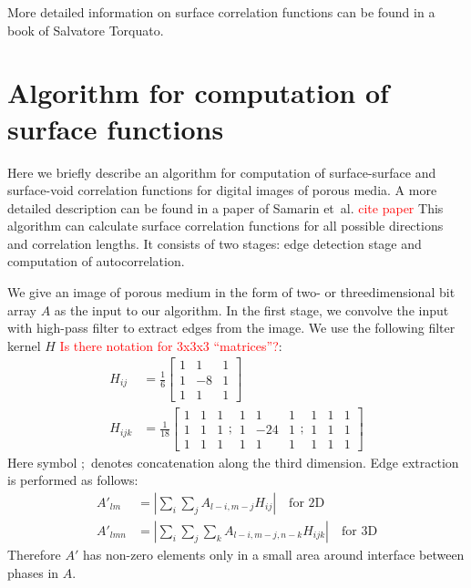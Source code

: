 \documentclass[reprint,amsmath,amssymb,aps,pre,showkeys,showpacs]{revtex4-1}
\begin{document}
More detailed information on surface correlation functions can be found in a
book of Salvatore Torquato\cite{Torquato_book}.

\section{Algorithm for computation of surface functions}
\label{sec:algo}
Here we briefly describe an algorithm for computation of surface-surface and
surface-void correlation functions for digital images of porous media. A more
detailed description can be found in a paper of Samarin
et~al. \textcolor{red}{cite paper} This algorithm can calculate surface
correlation functions for all possible directions and correlation lengths. It
consists of two stages: edge detection stage and computation of
autocorrelation.

We give an image of porous medium in the form of two- or threedimensional bit
array $A$ as the input to our algorithm. In the first stage, we convolve the
input with high-pass filter to extract edges from the image. We use the
following filter kernel $H$ \textcolor{red}{Is there notation for 3x3x3
  ``matrices''?}:
\begin{align}
  H_{ij} &= \frac{1}{6} \left[
    \begin{array}{ccc}
      1 & 1 & 1 \\
      1 & -8 & 1 \\
      1 & 1 & 1
    \end{array}
    \right] \label{eq:filter-3x3-2d} \\
  H_{ijk} &= \frac{1}{18} \left[
    \begin{array}{ccc}
      1 & 1 & 1 \\
      1 & 1 & 1 \\
      1 & 1 & 1
    \end{array} ;
    \begin{array}{ccc}
      1 & 1 & 1 \\
      1 & -24 & 1 \\
      1 & 1 & 1
    \end{array} ;
    \begin{array}{ccc}
      1 & 1 & 1 \\
      1 & 1 & 1 \\
      1 & 1 & 1
    \end{array}
    \right] \label{eq:filter-3x3-3d}
\end{align}
Here symbol $;$ denotes concatenation along the third dimension. Edge extraction
is performed as follows:
\begin{align*}
  A'_{lm}  &= \left| \sum_i\sum_j A_{l-i, m-j}H_{ij} \right| \quad \text{for 2D} \\
  A'_{lmn} &= \left| \sum_i\sum_j\sum_k A_{l-i, m-j, n-k}H_{ijk} \right| \quad
  \text{for 3D}
\end{align*}
Therefore $A'$ has non-zero elements only in a small area around interface
between phases in $A$.
\end{document}
